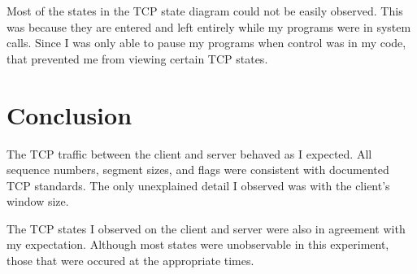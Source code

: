 \documentclass{article}
\begin{document}
Most of the states in the TCP state diagram could not be easily observed. This was because they
are entered and left entirely while my programs were in system calls. Since I was only able to
pause my programs when control was in my code, that prevented me from viewing certain TCP
states.

\section{Conclusion}
\label{sec:conclusion}

The TCP traffic between the client and server behaved as I expected. All sequence numbers,
segment sizes, and flags were consistent with documented TCP standards. The only unexplained
detail I observed was with the client's window size.

The TCP states I observed on the client and server were also in agreement with my expectation.
Although most states were unobservable in this experiment, those that were occured at the
appropriate times.
\end{document}
